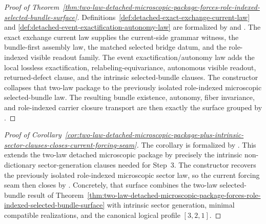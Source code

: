 \begin{proof}[Proof of Theorem~\ref{thm:two-law-detached-microscopic-package-forces-role-indexed-selected-bundle-surface}]
\label{proof:thm:two-law-detached-microscopic-package-forces-role-indexed-selected-bundle-surface}
Definitions~\ref{def:detached-exact-exchange-current-law} and
\ref{def:detached-event-exactification-autonomy-law} are formalized by
 and
. The exact exchange current law
supplies the current-side grammar witness, the bundle-first assembly law, the
matched selected bridge datum, and the role-indexed visible readout family.
The event exactification/autonomy law adds the local lossless exactification,
relabeling-equivariance, autonomous visible readout, returned-defect clause,
and the intrinsic selected-bundle clauses. The constructor
 collapses
that two-law package to the previously isolated role-indexed microscopic
selected-bundle law. The resulting bundle existence, autonomy, fiber
invariance, and role-indexed carrier closure transport are then exactly the
surface grouped by .
\end{proof}

\begin{proof}[Proof of Corollary~\ref{cor:two-law-detached-microscopic-package-plus-intrinsic-sector-clauses-closes-current-forcing-seam}]
\label{proof:cor:two-law-detached-microscopic-package-plus-intrinsic-sector-clauses-closes-current-forcing-seam}
The corollary is formalized by
. This extends the two-law
detached microscopic package by precisely the intrinsic non-dictionary
sector-generation clauses needed for Step~3. The constructor
recovers the previously isolated role-indexed microscopic sector law, so the
current forcing seam then closes by
. Concretely, that
surface combines the two-law selected-bundle result of
Theorem~\ref{thm:two-law-detached-microscopic-package-forces-role-indexed-selected-bundle-surface}
with intrinsic sector generation, minimal compatible realizations, and the
canonical logical profile \([3,2,1]\).
\end{proof}

